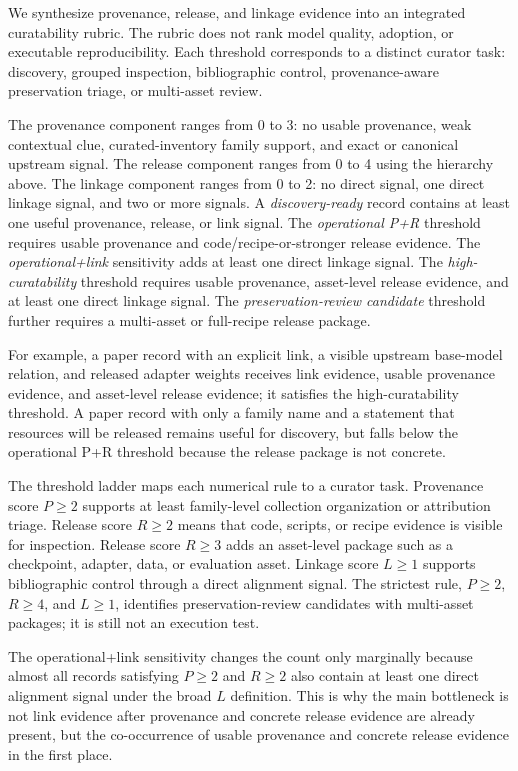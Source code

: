 We synthesize provenance, release, and linkage evidence into an integrated curatability rubric. The rubric does not rank model quality, adoption, or executable reproducibility. Each threshold corresponds to a distinct curator task: discovery, grouped inspection, bibliographic control, provenance-aware preservation triage, or multi-asset review.

The provenance component ranges from 0 to 3: no usable provenance, weak contextual clue, curated-inventory family support, and exact or canonical upstream signal. The release component ranges from 0 to 4 using the hierarchy above. The linkage component ranges from 0 to 2: no direct signal, one direct linkage signal, and two or more signals. A \textit{discovery-ready} record contains at least one useful provenance, release, or link signal. The \textit{operational P+R} threshold requires usable provenance and code/recipe-or-stronger release evidence. The \textit{operational+link} sensitivity adds at least one direct linkage signal. The \textit{high-curatability} threshold requires usable provenance, asset-level release evidence, and at least one direct linkage signal. The \textit{preservation-review candidate} threshold further requires a multi-asset or full-recipe release package.

For example, a paper record with an explicit \hf link, a visible upstream base-model relation, and released adapter weights receives link evidence, usable provenance evidence, and asset-level release evidence; it satisfies the high-curatability threshold. A paper record with only a family name and a statement that resources will be released remains useful for discovery, but falls below the operational P+R threshold because the release package is not concrete.

The threshold ladder maps each numerical rule to a curator task. Provenance score $P\geq2$ supports at least family-level collection organization or attribution triage. Release score $R\geq2$ means that code, scripts, or recipe evidence is visible for inspection. Release score $R\geq3$ adds an asset-level package such as a checkpoint, adapter, data, or evaluation asset. Linkage score $L\geq1$ supports bibliographic control through a direct alignment signal. The strictest rule, $P\geq2$, $R\geq4$, and $L\geq1$, identifies preservation-review candidates with multi-asset packages; it is still not an execution test.

The operational+link sensitivity changes the count only marginally because almost all records satisfying $P\geq2$ and $R\geq2$ also contain at least one direct alignment signal under the broad $L$ definition. This is why the main bottleneck is not link evidence after provenance and concrete release evidence are already present, but the co-occurrence of usable provenance and concrete release evidence in the first place.
